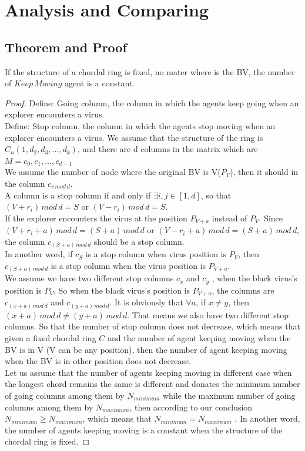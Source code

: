 \section{Analysis and Comparing}
\subsection{Theorem and Proof}
\begin{theorem}
If the structure of a chordal ring is fixed, no mater where is the BV, the number of $Keep\,Moving$ agent is a constant.
\end{theorem}
\begin{proof}


Define: Going column, the column in which the agents keep going when an explorer encounters a virus.\\
Define: Stop column, the column in which the agents stop moving when an explorer encounters a virus.
We assume that the structure of the ring is $C_n(1, d_2, d_3,\dots, d_k)$, and there are d columns in the matrix which are $M={c_0,c_1,\dots, c_{d-1}}$\\
We assume the number of node where the original BV is V($P_V$), then it should in the column $c_{v\,mod\,d}$.\\
A column  is a stop column if and only if $\exists i,j\in [1,d]$, so that $(V+r_i)\,mod\,d=S$ or $(V-r_i)\,mod\,d=S$.\\
If the explorer encounters the virus at the position $P_{V+a}$ instead of $P_V$. Since $(V+r_i+a)\,mod\,d=(S+a)\,mod\,d$ or $(V-r_i+a)\,mod\,d=(S+a)\,mod\,d$, the column $c_{(S+a)\,mod\,d}$ should be a stop column.\\
In another word, if $c_S$ is a stop column when virus position is $P_V$, then $c_{(S+a)\,mod\,d}$ is a stop column when the virus position is $P_{V+a}$.\\
We assume we have two different stop columns $c_x$ and $c_y$ , when the black virus's position is $P_V$.  So when the black virus's position is $P_{V+a}$, the columns are $c_{(x+a)\,mod\,d}$ and $c_{(y+a)\,mod\,d}$. It is obviously that $\forall a$, if $x\neq y$, then $(x+a)\,mod\,d\neq(y+a)\,mod\,d$. That means we also have two different stop columns. So that the number of stop column does not decrease, which means that given a fixed chordal ring $C$ and the number of agent keeping moving when the BV is in V (V can be any position), then the number of agent keeping moving when the BV is in other position does not decrease.\\
Let us assume that the number of agents keeping moving in different case when the longest chord remains the same is different and donates the minimum number of going columns among them by $N_{minimum}$ while the maximum number of going columns among them by $N_{maximum}$, then according to our conclusion $N_{minimum}\geq N_{maximum}$, which means that $N_{minimum}= N_{maximum}$ . In another word, the number of agents keeping moving is a constant when the structure of the chordal ring is fixed. 
\end{proof}


